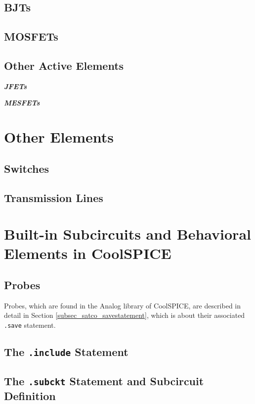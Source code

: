 \subsection{BJTs}
\label{subsec_sceadm_bjts}

\subsection{MOSFETs}
\label{subsec_sceadm_mosfets}

\subsection{Other Active Elements}
\label{subsec_sceadm_otheractiveelements}

\textbf{\textit{JFETs}}


\textbf{\textit{MESFETs}}



\section{Other Elements}
\label{sec_sceadm_otherelements}

\subsection{Switches}
\label{subsec_sceadm_switches}

\subsection{Transmission Lines}
\label{subsec_sceadm_transmissionlines}

\section{Built-in Subcircuits and Behavioral Elements in CoolSPICE}
\label{sec_sceadm_builtinsubcircuits}

\subsection{Probes}
\label{subsec_sceadm_probes}

Probes, which are found in the \textsf{Analog} library of CoolSPICE, are described in detail in Section \ref{subsec_satco_savestatement}, which is about their associated \texttt{.save} statement.  

\subsection{The \texttt{.include} Statement}
\label{sec_sceadm_includestatement}

\subsection{The \texttt{.subckt} Statement and Subcircuit Definition}
\label{sec_sceadm_subcktstatement}

